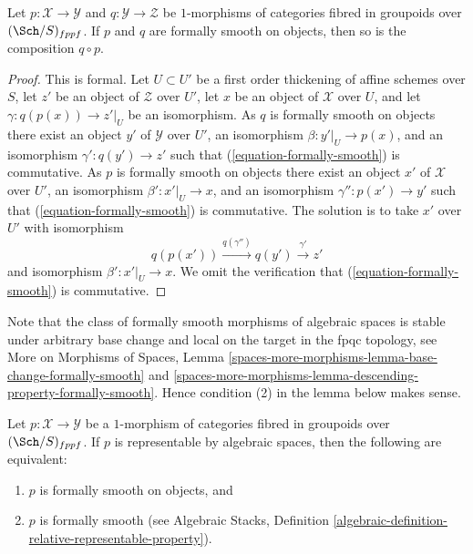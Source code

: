 \begin{lemma}
\label{lemma-composition-formally-smooth}
Let $p : \mathcal{X} \to \mathcal{Y}$ and $q : \mathcal{Y} \to \mathcal{Z}$
be $1$-morphisms of categories fibred in groupoids over $(\Sch/S)_{fppf}$.
If $p$ and $q$ are formally smooth on objects, then so is the composition
$q \circ p$.
\end{lemma}

\begin{proof}
This is formal. Let $U \subset U'$ be a first order thickening
of affine schemes over $S$, let $z'$ be an object of $\mathcal{Z}$
over $U'$, let $x$ be an object of $\mathcal{X}$ over $U$,
and let $\gamma : q(p(x)) \to z'|_U$ be an isomorphism. As $q$ is
formally smooth on objects there exist an object
$y'$ of $\mathcal{Y}$ over $U'$, an isomorphism
$\beta : y'|_U \to p(x)$, and an isomorphism $\gamma' : q(y') \to z'$
such that (\ref{equation-formally-smooth}) is commutative. As $p$ is
formally smooth on objects there exist an object
$x'$ of $\mathcal{X}$ over $U'$, an isomorphism
$\beta' : x'|_U \to x$, and an isomorphism $\gamma'' : p(x') \to y'$
such that (\ref{equation-formally-smooth}) is commutative.
The solution is to take $x'$ over $U'$ with isomorphism
$$
q(p(x')) \xrightarrow{q(\gamma'')} q(y') \xrightarrow{\gamma'} z'
$$
and isomorphism $\beta' : x'|_U \to x$. We omit the verification
that (\ref{equation-formally-smooth}) is commutative.
\end{proof}

\noindent
Note that the class of formally smooth morphisms of algebraic spaces is
stable under arbitrary base change and local on the target in the
fpqc topology, see
More on Morphisms of Spaces,
Lemma \ref{spaces-more-morphisms-lemma-base-change-formally-smooth} and
\ref{spaces-more-morphisms-lemma-descending-property-formally-smooth}.
Hence condition (2) in the lemma below makes sense.

\begin{lemma}
\label{lemma-representable-by-spaces-formally-smooth}
Let $p : \mathcal{X} \to \mathcal{Y}$ be a $1$-morphism of categories
fibred in groupoids over $(\Sch/S)_{fppf}$. If $p$ is
representable by algebraic spaces, then the following are equivalent:
\begin{enumerate}
\item $p$ is formally smooth on objects, and
\item $p$ is formally smooth (see
Algebraic Stacks,
Definition \ref{algebraic-definition-relative-representable-property}).
\end{enumerate}
\end{lemma}

